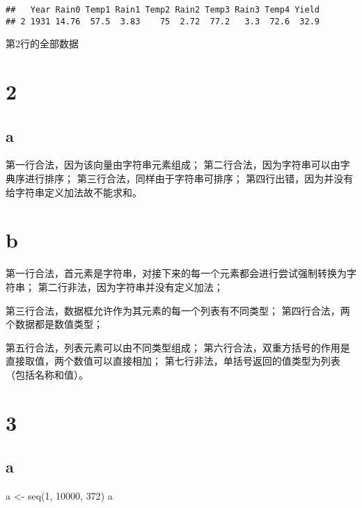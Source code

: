 \documentclass[
]{article}
\newenvironment{Shaded}{\begin{snugshade}}{\end{snugshade}}
\newcommand{\DecValTok}[1]{\textcolor[rgb]{0.00,0.00,0.81}{#1}}
\newcommand{\FunctionTok}[1]{\textcolor[rgb]{0.00,0.00,0.00}{#1}}
\newcommand{\NormalTok}[1]{#1}
\newcommand{\OtherTok}[1]{\textcolor[rgb]{0.56,0.35,0.01}{#1}}
\begin{document}
\begin{verbatim}
##   Year Rain0 Temp1 Rain1 Temp2 Rain2 Temp3 Rain3 Temp4 Yield
## 2 1931 14.76  57.5  3.83    75  2.72  77.2   3.3  72.6  32.9
\end{verbatim}

第2行的全部数据

\hypertarget{section-1}{%
\section{2}\label{section-1}}

\hypertarget{a-1}{%
\subsection{a}\label{a-1}}

第一行合法，因为该向量由字符串元素组成；
第二行合法，因为字符串可以由字典序进行排序；
第三行合法，同样由于字符串可排序；
第四行出错，因为并没有给字符串定义加法故不能求和。

\hypertarget{b-1}{%
\section{b}\label{b-1}}

第一行合法，首元素是字符串，对接下来的每一个元素都会进行尝试强制转换为字符串；
第二行非法，因为字符串并没有定义加法；

第三行合法，数据框允许作为其元素的每一个列表有不同类型；
第四行合法，两个数据都是数值类型；

第五行合法，列表元素可以由不同类型组成；
第六行合法，双重方括号的作用是直接取值，两个数值可以直接相加；
第七行非法，单括号返回的值类型为列表（包括名称和值）。

\hypertarget{section-2}{%
\section{3}\label{section-2}}

\hypertarget{a-2}{%
\subsection{a}\label{a-2}}

\begin{Shaded}
\begin{Highlighting}[]
\NormalTok{a }\OtherTok{\textless{}{-}} \FunctionTok{seq}\NormalTok{(}\DecValTok{1}\NormalTok{, }\DecValTok{10000}\NormalTok{, }\DecValTok{372}\NormalTok{)}
\NormalTok{a}
\end{Highlighting}
\end{Shaded}
\end{document}
